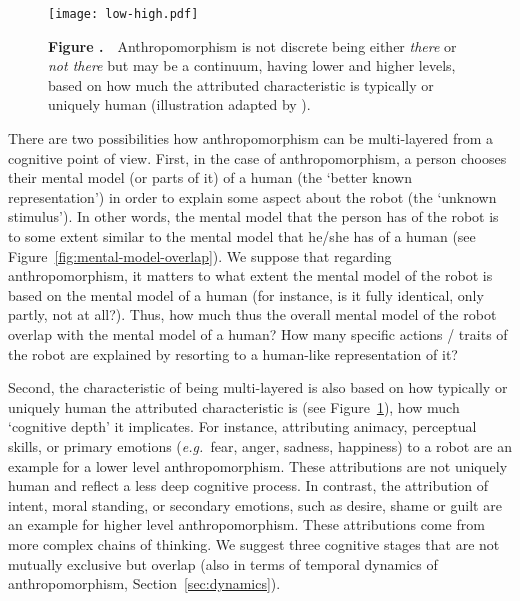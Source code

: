 \documentclass{frontiersSCNS} %
\newcommand{\eg}{{\textit{e.g.~}}}
\begin{document}
\nocite{hegel_theory_2008}

\begin{figure}[!b]
\begin{center}
\texttt{[image: low-high.pdf]}
\end{center}
 \textbf{\label{fig:low-high} Figure .}{~~\small Anthropomorphism is not discrete being either \textit{there} or \textit{not there} but may be a continuum, having lower and higher levels, based on how much the attributed characteristic is typically or uniquely human (illustration adapted by \cite{ruijten_introducing_2014}).}
\end{figure}

There are two possibilities how anthropomorphism can be multi-layered from a cognitive point of view.
First, in the case of anthropomorphism, a person chooses their mental model (or parts of it) of a human (the `better known representation') in order to explain some aspect about the robot (the `unknown stimulus'). In other words, the mental model that the person has of the robot is to some extent similar to the mental model that he/she has of a human (see Figure~\ref{fig:mental-model-overlap}).
We suppose that regarding anthropomorphism, it matters to what extent the mental model of the robot is based on the mental model of a human (for instance, is it fully identical, only partly, not at all?).
Thus, how much thus the overall mental model of the robot overlap with the mental model of a human? How many specific actions / traits of the robot are explained by resorting to a human-like representation of it?

Second, the characteristic of being multi-layered is also based on how typically or uniquely human the attributed characteristic is (see Figure~\ref{fig:low-high}), how much `cognitive depth' it implicates. For instance, attributing animacy, perceptual skills, or primary emotions (\eg fear, anger, sadness, happiness) to a robot are an example for a lower level anthropomorphism. These attributions are not uniquely human and reflect a less deep cognitive process. In contrast, the attribution of intent, moral standing, or secondary emotions, such as desire, shame or guilt are an example for higher level anthropomorphism. These attributions come from more complex chains of thinking. We suggest three cognitive stages that are not mutually exclusive but overlap (also in terms of temporal dynamics of anthropomorphism, Section~\ref{sec:dynamics}).
\end{document}
